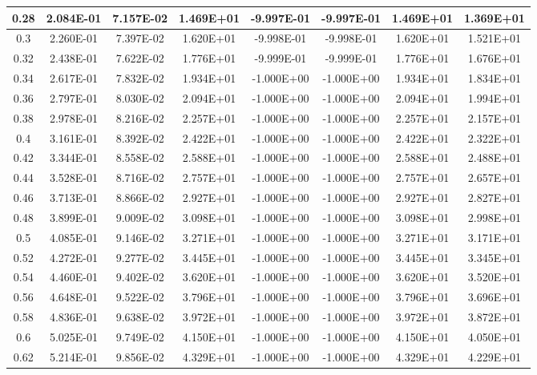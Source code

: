 \documentclass{article}
\begin{document}
\begin{center}
\begin{longtable}{|c|c|c|c|c|c|c|c|}
        0.28 & 2.084E-01 & 7.157E-02 & 1.469E+01 & -9.997E-01 & -9.997E-01 & 1.469E+01 & 1.369E+01 \\ \hline
        0.3 & 2.260E-01 & 7.397E-02 & 1.620E+01 & -9.998E-01 & -9.998E-01 & 1.620E+01 & 1.521E+01 \\ \hline
        0.32 & 2.438E-01 & 7.622E-02 & 1.776E+01 & -9.999E-01 & -9.999E-01 & 1.776E+01 & 1.676E+01 \\ \hline
        0.34 & 2.617E-01 & 7.832E-02 & 1.934E+01 & -1.000E+00 & -1.000E+00 & 1.934E+01 & 1.834E+01 \\ \hline
        0.36 & 2.797E-01 & 8.030E-02 & 2.094E+01 & -1.000E+00 & -1.000E+00 & 2.094E+01 & 1.994E+01 \\ \hline
        0.38 & 2.978E-01 & 8.216E-02 & 2.257E+01 & -1.000E+00 & -1.000E+00 & 2.257E+01 & 2.157E+01 \\ \hline
        0.4 & 3.161E-01 & 8.392E-02 & 2.422E+01 & -1.000E+00 & -1.000E+00 & 2.422E+01 & 2.322E+01 \\ \hline
        0.42 & 3.344E-01 & 8.558E-02 & 2.588E+01 & -1.000E+00 & -1.000E+00 & 2.588E+01 & 2.488E+01 \\ \hline
        0.44 & 3.528E-01 & 8.716E-02 & 2.757E+01 & -1.000E+00 & -1.000E+00 & 2.757E+01 & 2.657E+01 \\ \hline
        0.46 & 3.713E-01 & 8.866E-02 & 2.927E+01 & -1.000E+00 & -1.000E+00 & 2.927E+01 & 2.827E+01 \\ \hline
        0.48 & 3.899E-01 & 9.009E-02 & 3.098E+01 & -1.000E+00 & -1.000E+00 & 3.098E+01 & 2.998E+01 \\ \hline
        0.5 & 4.085E-01 & 9.146E-02 & 3.271E+01 & -1.000E+00 & -1.000E+00 & 3.271E+01 & 3.171E+01 \\ \hline
        0.52 & 4.272E-01 & 9.277E-02 & 3.445E+01 & -1.000E+00 & -1.000E+00 & 3.445E+01 & 3.345E+01 \\ \hline
        0.54 & 4.460E-01 & 9.402E-02 & 3.620E+01 & -1.000E+00 & -1.000E+00 & 3.620E+01 & 3.520E+01 \\ \hline
        0.56 & 4.648E-01 & 9.522E-02 & 3.796E+01 & -1.000E+00 & -1.000E+00 & 3.796E+01 & 3.696E+01 \\ \hline
        0.58 & 4.836E-01 & 9.638E-02 & 3.972E+01 & -1.000E+00 & -1.000E+00 & 3.972E+01 & 3.872E+01 \\ \hline
        0.6 & 5.025E-01 & 9.749E-02 & 4.150E+01 & -1.000E+00 & -1.000E+00 & 4.150E+01 & 4.050E+01 \\ \hline
        0.62 & 5.214E-01 & 9.856E-02 & 4.329E+01 & -1.000E+00 & -1.000E+00 & 4.329E+01 & 4.229E+01 \\ \hline

\end{longtable}
\end{center}
\end{document}
